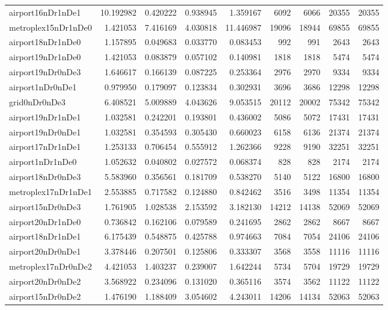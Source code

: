 \begin{longtable}{|l|r|r|r|r|r|r|r|r|}
airport16nDr1nDe1 & 10.192982 & 0.420222 & 0.938945 & 1.359167 & 6092 & 6066 & 20355 & 20355 \\
metroplex15nDr1nDe0 & 1.421053 & 7.416169 & 4.030818 & 11.446987 & 19096 & 18944 & 69855 & 69855 \\
airport18nDr1nDe0 & 1.157895 & 0.049683 & 0.033770 & 0.083453 & 992 & 991 & 2643 & 2643 \\
airport19nDr1nDe0 & 1.421053 & 0.083879 & 0.057102 & 0.140981 & 1818 & 1818 & 5474 & 5474 \\
airport19nDr0nDe3 & 1.646617 & 0.166139 & 0.087225 & 0.253364 & 2976 & 2970 & 9334 & 9334 \\
airport1nDr0nDe1 & 0.979950 & 0.179097 & 0.123834 & 0.302931 & 3696 & 3686 & 12298 & 12298 \\
grid0nDr0nDe3 & 6.408521 & 5.009889 & 4.043626 & 9.053515 & 20112 & 20002 & 75342 & 75342 \\
airport19nDr1nDe1 & 1.032581 & 0.242201 & 0.193801 & 0.436002 & 5086 & 5072 & 17431 & 17431 \\
airport19nDr0nDe1 & 1.032581 & 0.354593 & 0.305430 & 0.660023 & 6158 & 6136 & 21374 & 21374 \\
airport17nDr1nDe1 & 1.253133 & 0.706454 & 0.555912 & 1.262366 & 9228 & 9190 & 32251 & 32251 \\
airport1nDr1nDe0 & 1.052632 & 0.040802 & 0.027572 & 0.068374 & 828 & 828 & 2174 & 2174 \\
airport18nDr0nDe3 & 5.583960 & 0.356561 & 0.181709 & 0.538270 & 5140 & 5122 & 16800 & 16800 \\
metroplex17nDr1nDe1 & 2.553885 & 0.717582 & 0.124880 & 0.842462 & 3516 & 3498 & 11354 & 11354 \\
airport15nDr0nDe3 & 1.761905 & 1.028538 & 2.153592 & 3.182130 & 14212 & 14138 & 52069 & 52069 \\
airport20nDr1nDe0 & 0.736842 & 0.162106 & 0.079589 & 0.241695 & 2862 & 2862 & 8667 & 8667 \\
airport18nDr1nDe1 & 6.175439 & 0.548875 & 0.425788 & 0.974663 & 7084 & 7054 & 24106 & 24106 \\
airport20nDr0nDe1 & 3.378446 & 0.207501 & 0.125806 & 0.333307 & 3568 & 3558 & 11116 & 11116 \\
metroplex17nDr0nDe2 & 4.421053 & 1.403237 & 0.239007 & 1.642244 & 5734 & 5704 & 19729 & 19729 \\
airport20nDr0nDe2 & 3.568922 & 0.234096 & 0.131020 & 0.365116 & 3574 & 3562 & 11122 & 11122 \\
airport15nDr0nDe2 & 1.476190 & 1.188409 & 3.054602 & 4.243011 & 14206 & 14134 & 52063 & 52063 \\

\end{longtable}
